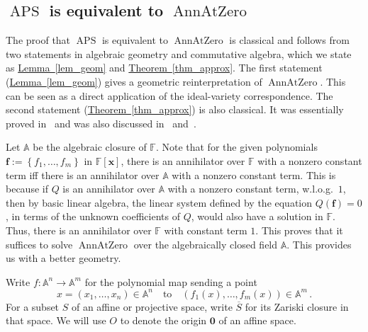 \documentclass[11pt]{article}
\numberwithin{equation}{section}
\theoremstyle{definition}
\theoremstyle{plain}
\newcommand{\expref}[2]{\hyperref[#2]{#1~\ref{#2}}}
\newcommand{\F}{\mathbb{F}}
\newcommand{\aff}{\mathbb{A}}
\newcommand{\inbrace }[1]{\left\{#1\right\}}
\DeclareMathOperator{\APS}{\mathrm{APS}\xspace} %
\DeclareMathOperator{\AnnAtZero}{\mathrm{AnnAtZero}\xspace} %
\begin{document}
\subsection{\texorpdfstring{$\APS$}{APS} is equivalent to \texorpdfstring{$\AnnAtZero$}{AnnAtZero}}

The proof that $\APS$ is equivalent to $\AnnAtZero$ is classical and follows from two statements in algebraic geometry and commutative algebra, which we state as \expref{Lemma}{lem_geom} and \expref{Theorem}{thm_approx}.
The first statement (\expref{Lemma}{lem_geom}) gives a geometric reinterpretation of $\AnnAtZero$. This can be seen as a direct application of the ideal-variety correspondence. 
The second statement (\expref{Theorem}{thm_approx})  is also classical. It was essentially proved in~\cite{LL89} and was also discussed in~\cite[Lemma~20.28]{burgisser2013algebraic} and~\cite[Page~37:53]{grochow2018circuit}.

%

Let $\aff$ be the algebraic closure of $\F$. Note that for the given polynomials $\mathbf f:= \inbrace{f_1,\dots,f_m}$ in $\F[\mathbf x]$, there is an annihilator over $\F$ with 
%
a nonzero %
constant term iff there is an annihilator over $\aff$ with 
%
a nonzero %
constant term. This is because if $Q$ is an annihilator over $\aff$ with 
%
a nonzero %
constant term, w.l.o.g.\ $1$, then by basic linear algebra, the linear system defined by the equation $Q(\mathbf f)=0$, in terms of the unknown coefficients of $Q$, would also have a solution in $\F$. Thus, there is an annihilator over $\F$ with constant term $1$. This proves that it suffices to solve $\AnnAtZero$ over the algebraically closed field $\aff$. This provides us with a better geometry. 

Write $f:\aff^n\to \aff^m$ for the polynomial map sending a point
\[
  x=(x_1,\dots,x_n)\in \aff^n\quad\text{to}\quad (f_1(x),\dots,f_m(x))\in \aff^m\,.
  \]
  For a subset $S$ of an affine or projective space, write
  $\overline{S}$ for its Zariski closure in that space. We will use
  $O$ to denote the origin $\mathbf 0$ of an affine space.

%
 
\end{document}
